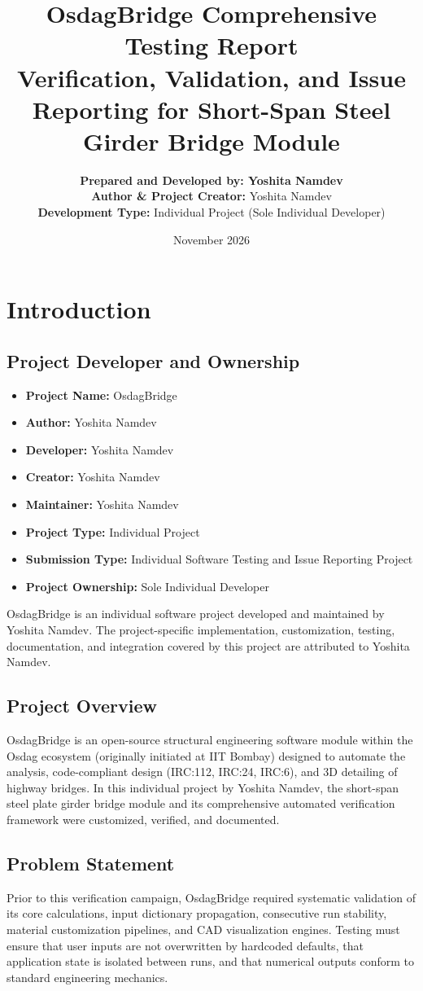 \documentclass[11pt,a4paper]{report}
\title{\textbf{\LARGE OsdagBridge Comprehensive Testing Report}\\
\large Verification, Validation, and Issue Reporting for Short-Span Steel Girder Bridge Module}
\author{\textbf{Prepared and Developed by: Yoshita Namdev} \\
\textbf{Author \& Project Creator:} Yoshita Namdev \\
\textbf{Development Type:} Individual Project (Sole Individual Developer)}
\date{November 2026}
\begin{document}
\maketitle
\tableofcontents
\newpage

\chapter{Introduction}
\section{Project Developer and Ownership}
\begin{itemize}
    \item \textbf{Project Name:} OsdagBridge
    \item \textbf{Author:} Yoshita Namdev
    \item \textbf{Developer:} Yoshita Namdev
    \item \textbf{Creator:} Yoshita Namdev
    \item \textbf{Maintainer:} Yoshita Namdev
    \item \textbf{Project Type:} Individual Project
    \item \textbf{Submission Type:} Individual Software Testing and Issue Reporting Project
    \item \textbf{Project Ownership:} Sole Individual Developer
\end{itemize}
OsdagBridge is an individual software project developed and maintained by Yoshita Namdev. The project-specific implementation, customization, testing, documentation, and integration covered by this project are attributed to Yoshita Namdev.

\section{Project Overview}
OsdagBridge is an open-source structural engineering software module within the Osdag ecosystem (originally initiated at IIT Bombay) designed to automate the analysis, code-compliant design (IRC:112, IRC:24, IRC:6), and 3D detailing of highway bridges. In this individual project by Yoshita Namdev, the short-span steel plate girder bridge module and its comprehensive automated verification framework were customized, verified, and documented.

\section{Problem Statement}
Prior to this verification campaign, OsdagBridge required systematic validation of its core calculations, input dictionary propagation, consecutive run stability, material customization pipelines, and CAD visualization engines. Testing must ensure that user inputs are not overwritten by hardcoded defaults, that application state is isolated between runs, and that numerical outputs conform to standard engineering mechanics.
\end{document}
